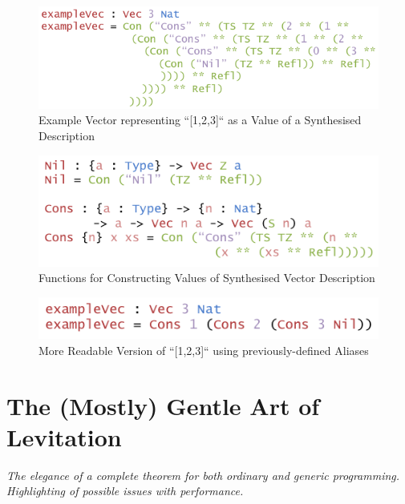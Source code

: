 \documentclass{ituthesis}
\begin{document}
\begin{figure}[ht]
\begin{center}
    \includegraphics[scale=0.5]{Figures/VectorSynthesisedExample.png}
\end{center}
\caption{Example Vector representing ``[1,2,3]`` as a Value of a Synthesised Description}
\label{fig:exmvecsynthvecdesc}
\end{figure}

\begin{figure}[ht]
\begin{center}
    \includegraphics[scale=0.5]{Figures/VectorSynthesisedConstructors.png}
\end{center}
\caption{Functions for Constructing Values of Synthesised Vector Description}
\label{fig:funcconstrsynthvec}
\end{figure}

\begin{figure}[ht]
\begin{center}
    \includegraphics[scale=0.5]{Figures/VectorSynthesisedConstructorsExample.png}
\end{center}
\caption{More Readable Version of ``[1,2,3]`` using previously-defined Aliases}
\label{fig:exmvecsynthvecdescconstrs}
\end{figure}

\section{The (Mostly) Gentle Art of Levitation}
\label{sec:TheMostlyGentleArtofLevitation}
\textit{The elegance of a complete theorem for both ordinary and generic programming. Highlighting of possible issues with performance.}
\end{document}
